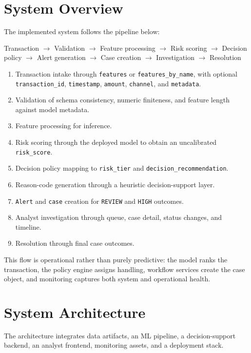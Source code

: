 \documentclass[11pt]{article}
\newcommand{\code}[1]{\texttt{#1}}
\begin{document}
\section{System Overview}
The implemented system follows the pipeline below:

\begin{center}
Transaction $\rightarrow$ Validation $\rightarrow$ Feature processing $\rightarrow$ Risk scoring $\rightarrow$ Decision policy $\rightarrow$ Alert generation $\rightarrow$ Case creation $\rightarrow$ Investigation $\rightarrow$ Resolution
\end{center}

\begin{enumerate}[leftmargin=1.5em]
  \item Transaction intake through \code{features} or \code{features_by_name}, with optional \code{transaction_id}, \code{timestamp}, \code{amount}, \code{channel}, and \code{metadata}.
  \item Validation of schema consistency, numeric finiteness, and feature length against model metadata.
  \item Feature processing for inference.
  \item Risk scoring through the deployed model to obtain an uncalibrated \code{risk_score}.
  \item Decision policy mapping to \code{risk_tier} and \code{decision_recommendation}.
  \item Reason-code generation through a heuristic decision-support layer.
  \item \code{Alert} and \code{case} creation for \code{REVIEW} and \code{HIGH} outcomes.
  \item Analyst investigation through queue, case detail, status changes, and timeline.
  \item Resolution through final case outcomes.
\end{enumerate}

This flow is operational rather than purely predictive: the model ranks the transaction, the policy engine assigns handling, workflow services create the case object, and monitoring captures both system and operational health.

\section{System Architecture}
The architecture integrates data artifacts, an ML pipeline, a decision-support backend, an analyst frontend, monitoring assets, and a deployment stack.
\end{document}
